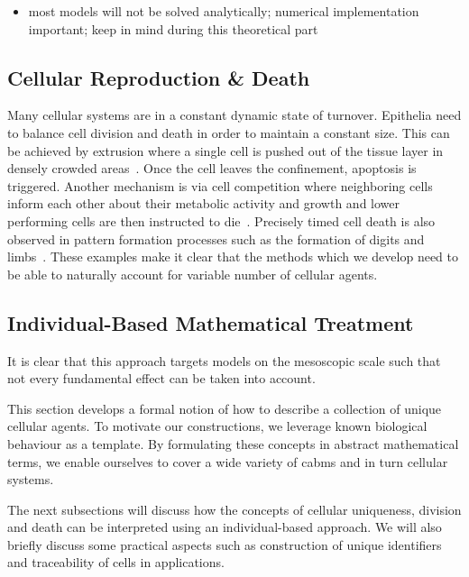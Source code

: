 \begin{itemize}
    \item most models will not be solved analytically; numerical implementation important; keep in
        mind during this theoretical part
\end{itemize}

\subsection{Cellular Reproduction \& Death}
Many cellular systems are in a constant dynamic state of turnover.
Epithelia need to balance cell division and death in order to maintain a constant size.
This can be achieved by extrusion where a single cell is pushed out of the tissue layer in densely
crowded areas~\cite{Eisenhoffer2012}.
Once the cell leaves the confinement, apoptosis is triggered.
Another mechanism is via cell competition where neighboring cells inform each other about their
metabolic activity and growth and lower performing cells are then instructed to
die~\cite{Amoyel2014}.
Precisely timed cell death is also observed in pattern formation processes such as the formation of
digits and limbs~\cite{Zou1996,Weatherbee2006}.
These examples make it clear that the methods which we develop need to be able to naturally account
for variable number of cellular agents.

\subsection{Individual-Based Mathematical Treatment}
It is clear that this approach targets models on the mesoscopic scale such that not every
fundamental effect can be taken into account.

This section develops a formal notion of how to describe a collection of unique cellular agents.
To motivate our constructions, we leverage known biological behaviour as a template.
By formulating these concepts in abstract mathematical terms, we enable ourselves to cover a wide
variety of \acp{cabm} and in turn cellular systems.

The next subsections will discuss how the concepts of cellular uniqueness, division and death can be
interpreted using an individual-based approach.
We will also briefly discuss some practical aspects such as construction of unique identifiers and
traceability of cells in applications.

